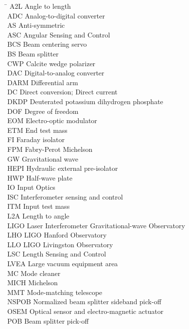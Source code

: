\begin{tabbing}
\hspace{1in} \= \kill
A2L \> Angle to length \\
ADC \> Analog-to-digital converter \\
AS \> Anti-symmetric \\
ASC \> Angular Sensing and Control \\
BCS \> Beam centering servo \\
BS \> Beam splitter \\
CWP \> Calcite wedge polarizer \\
DAC \> Digital-to-analog converter\\
DARM \> Differential arm \\
DC \> Direct conversion; Direct current \\
DKDP \> Deuterated potassium dihydrogen phosphate \\
DOF \> Degree of freedom \\
EOM \> Electro-optic modulator \\
ETM \> End test mass \\
FI \> Faraday isolator \\
FPM \> Fabry-Perot Michelson \\
GW \> Gravitational wave \\
HEPI \> Hydraulic external pre-isolator \\
HWP \> Half-wave plate \\
IO \> Input Optics \\
ISC \> Interferometer sensing and control \\
ITM \> Input test mass \\
L2A \> Length to angle \\
LIGO \> Laser Interferometer Gravitational-wave Observatory \\
LHO \> LIGO Hanford Observatory \\
LLO \> LIGO Livingston Observatory \\
LSC \> Length Sensing and Control \\
LVEA \> Large vacuum equipment area \\
MC \> Mode cleaner \\
MICH \> Michelson \\
MMT \> Mode-matching telescope \\
NSPOB \> Normalized beam splitter sideband pick-off \\
OSEM \> Optical sensor and electro-magnetic actuator \\
POB \> Beam splitter pick-off \\

\end{tabbing}
